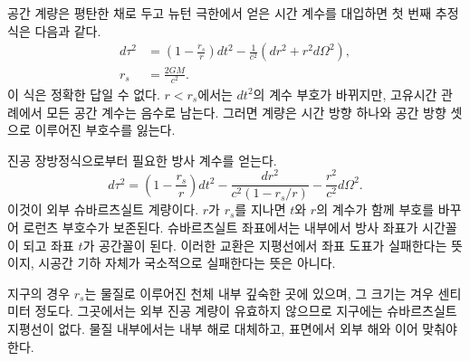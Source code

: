 공간 계량은 평탄한 채로 두고 뉴턴 극한에서 얻은 시간 계수를 대입하면 첫 번째 추정식은 다음과 같다.
\begin{equation}
\begin{aligned}
d\tau^2
&=\left(1-\frac{r_s}{r}\right)dt^2
-\frac{1}{c^2}\left(dr^2+r^2d\Omega^2\right),\\
r_s&=\frac{2GM}{c^2}.
\end{aligned}
\label{eq:l5-naive-schwarzschild}
\end{equation}
이 식은 정확한 답일 수 없다. \(r<r_s\)에서는 \(dt^2\)의 계수 부호가 바뀌지만, 고유시간 관례에서 모든 공간 계수는 음수로 남는다. 그러면 계량은 시간 방향 하나와 공간 방향 셋으로 이루어진 부호수를 잃는다.

진공 장방정식으로부터 필요한 방사 계수를 얻는다.
\begin{equation}
\boxed{
d\tau^2
=\left(1-\frac{r_s}{r}\right)dt^2
-\frac{dr^2}{c^2\left(1-r_s/r\right)}
-\frac{r^2}{c^2}d\Omega^2.
}
\label{eq:l5-schwarzschild}
\end{equation}
이것이 외부 슈바르츠실트 계량이다. \(r\)가 \(r_s\)를 지나면 \(t\)와 \(r\)의 계수가 함께 부호를 바꾸어 로런츠 부호수가 보존된다. 슈바르츠실트 좌표에서는 내부에서 방사 좌표가 시간꼴이 되고 좌표 \(t\)가 공간꼴이 된다. 이러한 교환은 지평선에서 좌표 도표가 실패한다는 뜻이지, 시공간 기하 자체가 국소적으로 실패한다는 뜻은 아니다.

\begin{classroomqa}
\end{classroomqa}

\begin{classroomqa}
\end{classroomqa}

지구의 경우 \(r_s\)는 물질로 이루어진 천체 내부 깊숙한 곳에 있으며, 그 크기는 겨우 센티미터 정도다. 그곳에서는 외부 진공 계량이 유효하지 않으므로 지구에는 슈바르츠실트 지평선이 없다. 물질 내부에서는 내부 해로 대체하고, 표면에서 외부 해와 이어 맞춰야 한다.

